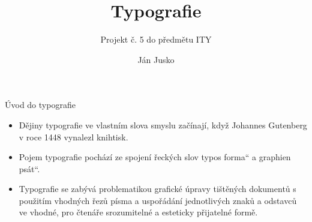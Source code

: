 \documentclass[fyma2,pdf,final]{prosper}
\begin{document}
\providecommand{\uv}[1]{\quotedblbase #1\textquotedblleft}

\title{Typografie}
\subtitle{Projekt č. 5 do předmětu ITY}
\author{Ján Jusko}

\maketitle

\begin{slide}{Úvod do typografie}
\begin{itemize}
	\item Dějiny typografie ve vlastním slova smyslu začínají, když Johannes Gutenberg v roce 1448 vynalezl knihtisk.\medskip
	\item Pojem typografie pochází ze spojení řeckých slov typos \uv{forma} a graphien \uv{psát}. \medskip
	\item Typografie se zabývá problematikou grafické úpravy tištěných dokumentů s použitím vhodných řezů písma a uspořádání jednotlivých znaků
 a odstavců ve vhodné, pro čtenáře srozumitelné a esteticky přijatelné formě.\medskip	
\end{itemize}
\end{slide}
\end{document}
